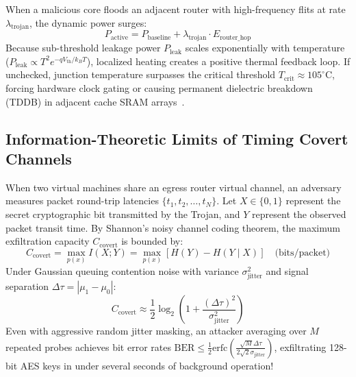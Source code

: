 When a malicious core floods an adjacent router with high-frequency flits at rate $\lambda_{\mathrm{trojan}}$, the dynamic power surges:
\begin{equation}
P_{\mathrm{active}} = P_{\mathrm{baseline}} + \lambda_{\mathrm{trojan}} \cdot E_{\mathrm{router\_hop}}
\end{equation}
Because sub-threshold leakage power $P_{\mathrm{leak}}$ scales exponentially with temperature ($P_{\mathrm{leak}} \propto T^2 e^{-q V_{\mathrm{th}} / k_B T}$), localized heating creates a positive thermal feedback loop. If unchecked, junction temperature surpasses the critical threshold $T_{\mathrm{crit}} \approx 105^\circ\mathrm{C}$, forcing hardware clock gating or causing permanent dielectric breakdown (TDDB) in adjacent cache SRAM arrays~\cite{Hasanzadeh2026Heat}.

\subsection{Information-Theoretic Limits of Timing Covert Channels}
When two virtual machines share an egress router virtual channel, an adversary measures packet round-trip latencies $\{t_1, t_2, \dots, t_N\}$. Let $X \in \{0, 1\}$ represent the secret cryptographic bit transmitted by the Trojan, and $Y$ represent the observed packet transit time. By Shannon's noisy channel coding theorem, the maximum exfiltration capacity $C_{\mathrm{covert}}$ is bounded by:
\begin{equation}
C_{\mathrm{covert}} = \max_{p(x)} I(X; Y) = \max_{p(x)} \left[ H(Y) - H(Y \mid X) \right] \quad \text{(bits/packet)}
\label{eq:covert-capacity}
\end{equation}
Under Gaussian queuing contention noise with variance $\sigma_{\mathrm{jitter}}^2$ and signal separation $\Delta \tau = |\mu_1 - \mu_0|$:
\begin{equation}
C_{\mathrm{covert}} \approx \frac{1}{2} \log_2 \left( 1 + \frac{(\Delta \tau)^2}{\sigma_{\mathrm{jitter}}^2} \right)
\end{equation}
Even with aggressive random jitter masking, an attacker averaging over $M$ repeated probes achieves bit error rates $\mathrm{BER} \le \frac{1}{2} \mathrm{erfc}\left( \frac{\sqrt{M} \Delta \tau}{2 \sqrt{2} \sigma_{\mathrm{jitter}}} \right)$, exfiltrating 128-bit AES keys in under several seconds of background operation!

